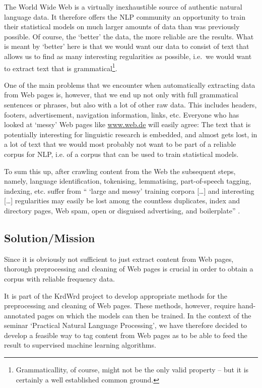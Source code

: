 \documentclass[12pt]{article}
\begin{document}
The World Wide Web is a virtually inexhaustible source of authentic natural language data. It therefore offers the NLP community an opportunity to train their statistical models on much larger amounts of data than was previously possible. 
Of course, the `better' the data, the more reliable are the results. 
What is meant by `better' here is that we would want our data to consist of text that allows us to find as many interesting regularities as possible, i.e.~we would want to extract text that is grammatical\footnote{Grammaticallity, of course, might not be the only valid property -- but it is certainly a well established common ground.}.

One of the main problems that we encounter when automatically extracting data from Web pages is, however, that we end up not only with full grammatical sentences or phrases, but also with a lot of other raw data. 
This includes headers, footers, advertisement, navigation information, links, etc. 
Everyone who has looked at `messy' Web pages like \url{www.web.de} will easily agree: The text that is potentially interesting for linguistic research is embedded, and almost gets lost, in a lot of text that we would most probably not want to be part of a reliable corpus for NLP, i.e. of a corpus that can be used to train statistical models. 

To sum this up, after crawling content from the Web the subsequent steps, namely, language identification, tokenising, lemmatising, part-of-speech tagging, indexing, etc. suffer from `` `large and messy' training corpora [\ldots] and interesting [\ldots] regularities may easily be lost among the countless duplicates, index and directory pages, Web spam, open or disguised advertising, and boilerplate'' \cite{Evert2008}.


\subsection{Solution/Mission}

Since it is obviously not sufficient to just extract content from Web pages, thorough preprocessing and cleaning of Web pages is crucial in order to obtain a corpus with reliable frequency data.

It is part of the KrdWrd project to develop appropriate methods for the preprocessing and cleaning of Web pages. 
These methods, however, require hand-annotated pages on which the models can then be trained. 
In the context of the seminar `Practical Natural Language Processing', we have therefore decided to develop a feasible way to tag content from Web pages as to be able to feed the result to supervised machine learning algorithms.
\end{document}
